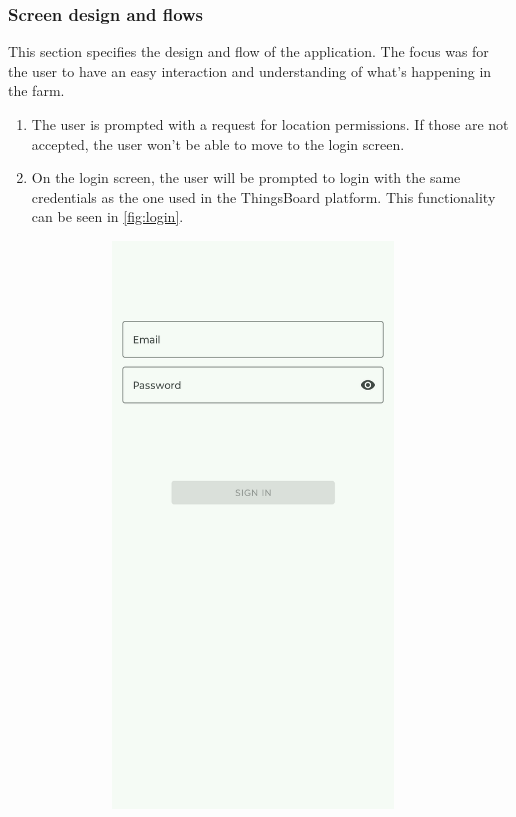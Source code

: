 \subsubsection*{Screen design and flows}

This section specifies the design and flow of the application. The focus was for the user to have an easy interaction and understanding of what's happening in the farm.
\begin{enumerate}
    \item The user is prompted with a request for location permissions. If those are not accepted, the user won't be able to move to the login screen. 
    \item On the login screen, the user will be prompted to login with the same credentials as the one used in the ThingsBoard platform. This functionality can be seen in \autoref{fig:login}.
        \begin{figure}[H]
            \centering
            \begin{subfigure}[t]{0.3\textwidth}
                \centering
                \includegraphics[width=0.882\textwidth]{images/8/01.png}

\end{subfigure}
\end{figure}
\end{enumerate}
